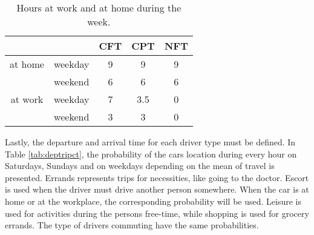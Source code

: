 \begin{table}[!ht]
    \caption{Hours at work and at home during the week.}
    \centering
    \begin{tabular}{ccccc}
    
        ~ & ~ & CFT & CPT & NFT \\ \hline
        at home & weekday & 9 & 9 & 9 \\ 
        ~ & weekend & 6 & 6 & 6 \\ 
        at work & weekday & 7 & 3.5 & 0 \\
        ~ & weekend & 3 & 3 & 0 \\ \hline
    \end{tabular}
    \label{tab:hoursatdest}
\end{table}

Lastly, the departure and arrival time for each driver type must be defined. In Table \ref{tab:deptripct}, the probability of the cars location during every hour on Saturdays, Sundays and on weekdays depending on the mean of travel is presented. Errands represents trips for necessities, like going to the doctor. Escort is used when the driver must drive another person somewhere. When the car is at home or at the workplace, the corresponding probability will be used. Leisure is used for activities during the persons free-time, while shopping is used for grocery errands. The type of drivers commuting have the same probabilities. 


